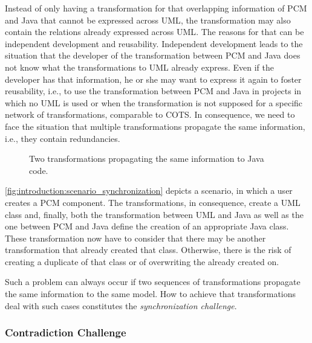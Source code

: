 Instead of only having a transformation for that overlapping information of \gls{PCM} and Java that cannot be expressed across \gls{UML}, the transformation may also contain the relations already expressed across \gls{UML}.
The reasons for that can be independent development and reusability.
Independent development leads to the situation that the developer of the transformation between \gls{PCM} and Java does not know what the transformations to \gls{UML} already express.
Even if the developer has that information, he or she may want to express it again to foster reusability, i.e., to use the transformation between \gls{PCM} and Java in projects in which no \gls{UML} is used or when the transformation is not supposed for a specific network of transformations, comparable to \gls{COTS}.
In consequence, we need to face the situation that multiple transformations propagate the same information, i.e., they contain redundancies.

\begin{figure}
    \centering
    
    \caption[Example for transformation synchronization]{Two transformations propagating the same information to Java code.}
    \label{fig:introduction:scenario_synchronization}
\end{figure}

\autoref{fig:introduction:scenario_synchronization} depicts a scenario, in which a user creates a \gls{PCM} component.
The transformations, in consequence, create a \gls{UML} class and, finally, both the transformation between \gls{UML} and Java as well as the one between \gls{PCM} and Java define the creation of an appropriate Java class.
These transformation now have to consider that there may be another transformation that already created that class.
Otherwise, there is the risk of creating a duplicate of that class or of overwriting the already created on.

Such a problem can always occur if two sequences of transformations propagate the same information to the same model. %
How to achieve that transformations deal with such cases constitutes the \emph{synchronization challenge}.

\subsubsection*{Contradiction Challenge}

